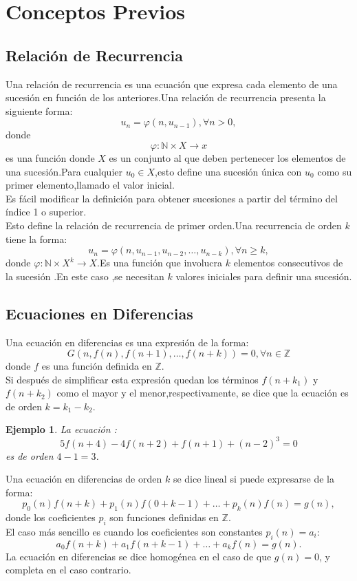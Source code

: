 \documentclass[a4,paper]{article}
\newtheorem{ejem}{Ejemplo}[subsection]
\begin{document}
\section{Conceptos Previos}
\subsection{Relación de Recurrencia}
Una relación de recurrencia es una ecuación que expresa cada elemento de una sucesión  en función de los anteriores.Una relación de recurrencia presenta la siguiente forma:
$$
u_{n} = \varphi (n,u_{n-1}) ,\forall n>0,
$$
donde 
$$
\varphi:\mathbb{N}\times X\rightarrow x
$$
es una función donde $ X $ es un conjunto al que deben pertenecer los elementos de una sucesión.Para cualquier $ u_{0} \in X $,esto define una sucesión única con $ u_{0} $ como su primer elemento,llamado el valor inicial.\\
Es fácil modificar la definición para obtener sucesiones a partir del término del índice 1 o superior.\\
Esto define la relación de recurrencia de primer orden.Una recurrencia de orden $ k $ tiene la forma:
$$
u_{n}=\varphi(n,u_{n-1},u_{n-2},\ldots,u_{n-k}),\forall n \geq k,
$$
donde $ \varphi:\mathbb{N}\times X^{k} \rightarrow X$.Es una función que involucra $ k $ elementos consecutivos de la sucesión .En este caso ,se necesitan $ k $ valores iniciales para definir una sucesión.
\subsection{Ecuaciones en Diferencias}
Una ecuación en diferencias es una expresión de la forma:
$$
G(n,f(n),f(n+1),\ldots,f(n+k))=0,\forall n \in \mathbb{Z}
$$
donde $ f $ es una función definida en $ \mathbb{Z} $.\\
Si después de simplificar esta expresión quedan los términos $ f(n+k_{1}) $ y $ f(n+k_{2}) $ como el mayor y el menor,respectivamente, se dice que la ecuación es de orden $ k=k_{1}-k_{2} .$
\begin{ejem}
La ecuación :
$$
5f(n+4)-4f(n+2)+f(n+1)+(n-2)^{3}=0
$$
es de orden $ 4-1=3$.
\end{ejem}
Una ecuación en diferencias de orden $ k $ se dice lineal si puede expresarse de la forma:
$$
p_{0}(n)f(n+k)+p_{1}(n)f(0+k-1)+\ldots+p_{k}(n)f(n)=g(n),
$$
donde los coeficientes $ p_{i} $ son funciones definidas en $ \mathbb{Z} $.\\
El caso más sencillo es cuando los coeficientes son constantes $ p_{i}(n)=a_{i}$:
$$
a_{0}f(n+k)+a_{1}f(n+k-1)+\ldots+a_{k}f(n)=g(n).
$$
La ecuación en diferencias se dice homogénea en el caso de que $ g(n)=0 $, y completa en el caso contrario.
\end{document}
